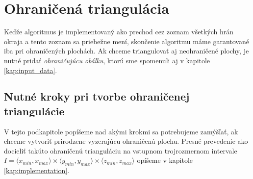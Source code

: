 \section{Ohraničená triangulácia}
\label{kap:bounded_triangulation}
Keďže algoritmus je implementovaný ako prechod cez zoznam všetkých hrán okraja a tento zoznam 
sa priebežne mení, skončenie algoritmu máme garantované iba pri ohraničených plochách.
Ak chceme triangulovať aj neohraničené plochy, je nutné pridať \textit{ohraničujúcu obálku}, 
ktorú sme spomenuli aj v kapitole \ref{kap:input_data}.

\subsection{Nutné kroky pri tvorbe ohraničenej triangulácie}

V tejto podkapitole popíšeme nad akými krokmi sa potrebujeme zamýšľať, ak chceme vytvoriť prirodzene 
vyzerajúcu ohraničenú plochu. Presné prevedenie
ako docieliť takúto ohraničenú trianguláciu na vstupnom trojrozmernom intervale 
$I = \langle x_{min}, x_{max} \rangle \times \langle y_{min}, y_{max} \rangle \times 
\langle z_{min}, z_{max} \rangle$ opíšeme v kapitole \ref{kap:implementation}.

